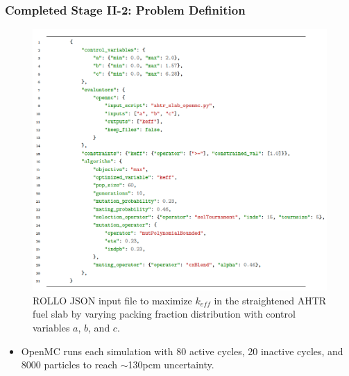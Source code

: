 \begin{frame}
    \frametitle{Completed Stage II-2: Problem Definition}
    \begin{figure}
        \vspace{-0.2cm}
        \begin{minipage}[c]{0.7\textwidth}
        \includegraphics[width=\linewidth]{figures/ii2-rollo-input.png}
        \end{minipage}\hfill
        \begin{minipage}[c]{0.3\textwidth}
        \caption{ROLLO JSON input file to maximize $k_{eff}$ in the 
        straightened AHTR fuel slab by varying packing fraction distribution 
        with control variables $a$, $b$, and $c$.}
        \end{minipage}
    \end{figure}
\begin{itemize}
    \item OpenMC runs each simulation with 80 active cycles, 20 inactive cycles, and 
    8000 particles to reach $\sim$130pcm uncertainty.
\end{itemize}
\end{frame}

